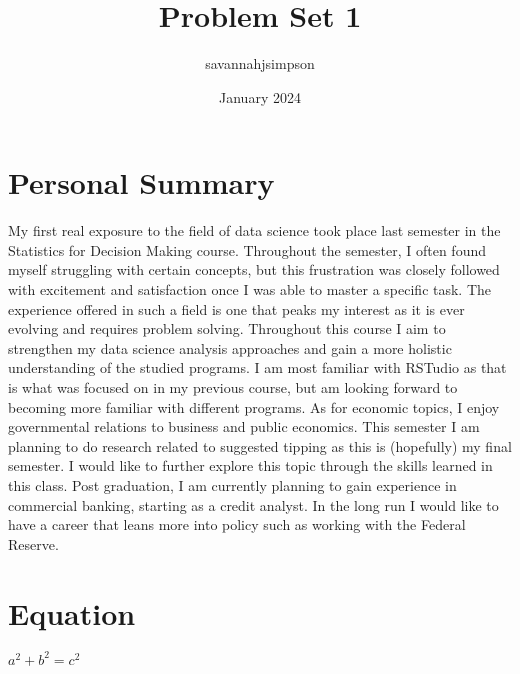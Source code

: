 \documentclass{article}
\title{Problem Set 1}
\author{savannahjsimpson }
\date{January 2024}
\begin{document}
\maketitle

\section{Personal Summary}
My first real exposure to the field of data science took place last semester in the Statistics for Decision Making course. Throughout the semester, I often found myself struggling with certain concepts, but this frustration was closely followed with excitement and satisfaction once I was able to master a specific task. The experience offered in such a field is one that peaks my interest as it is ever evolving and requires problem solving. Throughout this course I aim to strengthen my data science analysis approaches and gain a more holistic understanding of the studied programs. I am most familiar with RSTudio as that is what was focused on in my previous course, but am looking forward to becoming more familiar with different programs. As for economic topics, I enjoy governmental relations to business and public economics. This semester I am planning to do research related to suggested tipping as this is (hopefully) my final semester. I would like to further explore this topic through the skills learned in this class. Post graduation, I am currently planning to gain experience in commercial banking, starting as a credit analyst. In the long run I would like to have a career that leans more into policy such as working with the Federal Reserve. 

\section{Equation}
\(a^2 + b^2 = c^2\)
\end{document}

